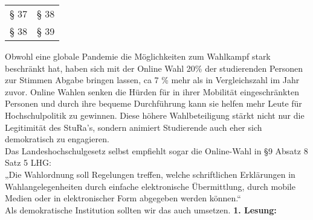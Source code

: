 {\begin{longtable}{|p{7.5cm}|p{7.5cm}|}
        § 37 & § 38 \\
        § 38 & § 39 \\
    \end{longtable}
}{
    Obwohl eine globale Pandemie die Möglichkeiten zum Wahlkampf stark beschränkt hat, haben sich mit der Online Wahl 20\% der studierenden Personen zur Stimmen Abgabe bringen lassen, ca 7 \% mehr als in Vergleichszahl im Jahr zuvor. Online Wahlen senken die Hürden für in ihrer Mobilität eingeschränkten Personen und durch ihre bequeme Durchführung kann sie helfen mehr Leute für Hochschulpolitik zu gewinnen. Diese höhere Wahlbeteiligung stärkt nicht nur die Legitimität des StuRa's, sondern animiert Studierende auch eher sich demokratisch zu engagieren.\\
    Das Landeshochschulgesetz selbst empfiehlt sogar die Online-Wahl in §9 Absatz 8 Satz 5 LHG:\\
    „Die Wahlordnung soll Regelungen treffen, welche schriftlichen Erklärungen in Wahlangelegenheiten durch einfache elektronische Übermittlung, durch mobile Medien oder in elektronischer Form abgegeben werden können.“\\
    Als demokratische Institution sollten wir das auch umsetzen.
}{
    \textbf{1. Lesung:}
    \ul{
}}

